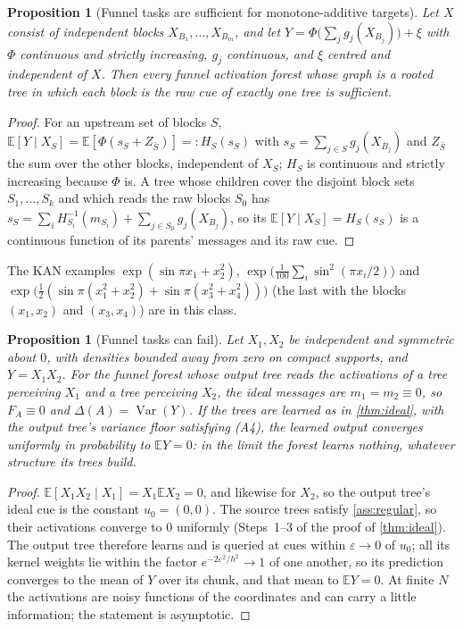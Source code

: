 \documentclass[11pt]{article}
\newtheorem{proposition}[theorem]{Proposition}
\theoremstyle{definition}
\theoremstyle{remark}
\newcommand{\E}{\mathbb{E}}
\newcommand{\Var}{\operatorname{Var}}
\begin{document}
\begin{proposition}[Funnel tasks are sufficient for monotone-additive targets]\label{prop:suffclass}
Let $X$ consist of independent blocks $X_{B_1},\dots,X_{B_m}$, and let
$Y=\Phi\bigl(\sum_jg_j(X_{B_j})\bigr)+\xi$ with $\Phi$ continuous and strictly increasing,
$g_j$ continuous, and $\xi$ centred and independent of $X$.  Then every funnel
activation forest whose graph is a rooted tree in which each block is the raw cue of
exactly one tree is sufficient.
\end{proposition}
\begin{proof}
For an upstream set of blocks $S$, $\E[Y\mid X_S]=\E[\Phi(s_S+Z_{\bar S})]=:H_S(s_S)$ with
$s_S=\sum_{j\in S}g_j(X_{B_j})$ and $Z_{\bar S}$ the sum over the other blocks, independent
of $X_S$; $H_S$ is continuous and strictly increasing because $\Phi$ is.  A tree whose
children cover the disjoint block sets $S_1,\dots,S_k$ and which reads the raw blocks $S_0$
has $s_S=\sum_iH_{S_i}^{-1}(m_{S_i})+\sum_{j\in S_0}g_j(X_{B_j})$, so its
$\E[Y\mid X_S]=H_S(s_S)$ is a continuous function of its parents' messages and its raw
cue.
\end{proof}

The KAN examples $\exp(\sin\pi x_1+x_2^2)$, $\exp\bigl(\tfrac1{100}\sum_i\sin^2(\pi x_i/2)\bigr)$
and $\exp\bigl(\tfrac12(\sin\pi(x_1^2+x_2^2)+\sin\pi(x_3^2+x_4^2))\bigr)$ (the last with
the blocks $(x_1,x_2)$ and $(x_3,x_4)$) are in this class.

\begin{proposition}[Funnel tasks can fail]\label{prop:xy}
Let $X_1,X_2$ be independent and symmetric about $0$, with densities bounded away from
zero on compact supports, and $Y=X_1X_2$.  For the funnel forest whose output tree reads
the activations of a tree perceiving $X_1$ and a tree perceiving $X_2$, the ideal
messages are $m_1=m_2\equiv0$, so $F_A\equiv0$ and $\Delta(A)=\Var(Y)$.  If the trees are
learned as in \cref{thm:ideal}, with the output tree's variance floor satisfying (A4),
the learned output converges uniformly in probability to $\E Y=0$: in the limit the
forest learns nothing, whatever structure its trees build.
\end{proposition}
\begin{proof}
$\E[X_1X_2\mid X_1]=X_1\E X_2=0$, and likewise for $X_2$, so the output tree's ideal cue
is the constant $u_0=(0,0)$.  The source trees satisfy \cref{ass:regular}, so their
activations converge to $0$ uniformly (Steps~1--3 of the proof of \cref{thm:ideal}).  The
output tree therefore learns and is queried at cues within $\varepsilon\to0$ of $u_0$;
all its kernel weights lie within the factor $e^{-2\varepsilon^2/h^2}\to1$ of one another,
so its prediction converges to the mean of $Y$ over its chunk, and that mean to $\E Y=0$.
At finite $N$ the activations are noisy functions of the coordinates and can carry a
little information; the statement is asymptotic.
\end{proof}
\end{document}
